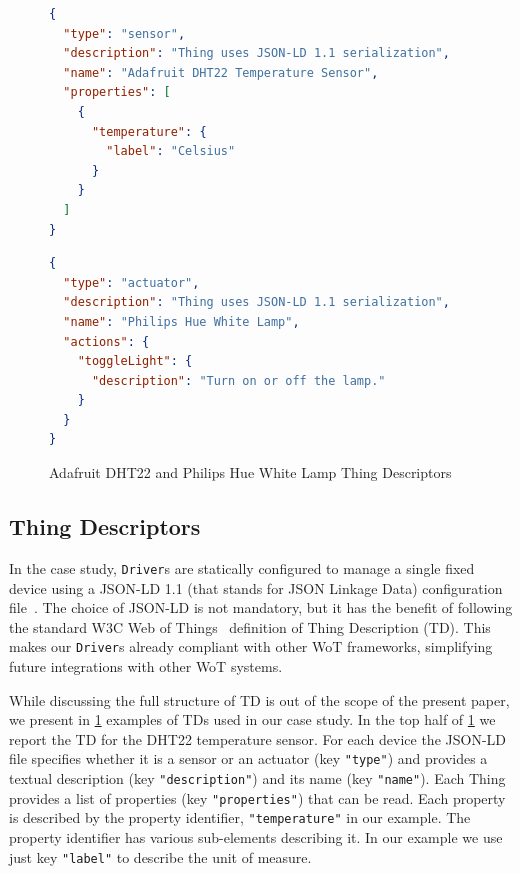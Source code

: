 \begin{figure}[b]
  \centering
  \begin{lstlisting}[language=json]
{
  "type": "sensor",
  "description": "Thing uses JSON-LD 1.1 serialization",
  "name": "Adafruit DHT22 Temperature Sensor",
  "properties": [
    {
      "temperature": {
        "label": "Celsius"
      }
    }
  ]
}
\end{lstlisting}
\begin{lstlisting}[language=json]
{
  "type": "actuator",
  "description": "Thing uses JSON-LD 1.1 serialization",
  "name": "Philips Hue White Lamp",
  "actions": {
    "toggleLight": {
      "description": "Turn on or off the lamp."
    }
  }
}
\end{lstlisting}
  \caption{Adafruit DHT22 and Philips Hue White Lamp Thing Descriptors}
  \label{fig:sensor_descriptor}
\end{figure}

\subsection{Thing Descriptors}

In the case study, \texttt{Driver}s are statically configured to manage a
single fixed device using a JSON-LD 1.1 (that stands for JSON Linkage Data)
configuration file~\cite{jsonld}. The choice of JSON-LD is not mandatory, but
it has the benefit of following the standard W3C Web of Things~\cite{w3c17}
definition of Thing Description (TD). This makes our \texttt{Driver}s already
compliant with other WoT frameworks, simplifying future integrations with
other WoT systems.

While discussing the full structure of TD is out of the scope of the present
paper, we present in \cref{fig:sensor_descriptor} examples of TDs used in our
case study. In the top half of \cref{fig:sensor_descriptor} we report the TD
for the DHT22 temperature sensor. For each device the JSON-LD file
specifies whether it is a sensor or an actuator (key \lstinline|"type"|) and
provides a textual description (key \lstinline|"description"|) and its name
(key \lstinline|"name"|). Each Thing provides a list of
properties (key \lstinline|"properties"|) that can be read. Each property is
described by the property identifier, \lstinline{"temperature"} in our
example. The property identifier has various sub-elements describing it. In
our example we use just key \lstinline{"label"} to describe the unit of
measure.


